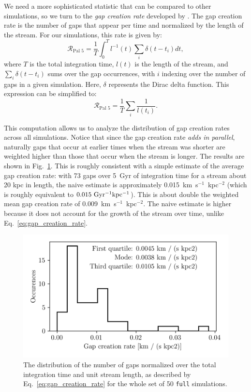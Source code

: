 \documentclass[draft]{aa}
\begin{document}
    We need a more sophisticated statistic that can be compared to other simulations, so we turn to the \textit{gap creation rate} developed by \citet{2012ApJ...748...20C}. The gap creation rate is the number of gaps that appear per time and normalized by the length of the stream. For our simulations, this rate is given by: \begin{equation} \label{eq:gap_creation_rate} \mathcal{R}_{\textrm{Pal 5}} =  \frac{1}{T}\int_{0}^T l^{-1}(t) \sum_i \delta(t-t_i) dt,\end{equation}where $T$ is the total integration time, $l(t)$ is the length of the stream, and $\sum_i \delta(t-t_i)$ sums over the gap occurrences, with $i$ indexing over the number of gaps in a given simulation. Here, $\delta$ represents the Dirac delta function. This expression can be simplified to:\begin{equation}\mathcal{R}_{\textrm{Pal 5}} =  \frac{1}{T} \sum_i \frac{1}{l (t_i)}. \end{equation}
    
    This computation allows us to analyze the distribution of gap creation rates across all simulations. Notice that since the gap creation rate \textit{adds in parallel}, naturally gaps that occur at earlier times when the stream was shorter are weighted higher than those that occur when the stream is longer. The results are shown in Fig.~\ref{fig:gapcreationrate}. This is roughly consistent with a simple estimate of the average gap creation rate: with 73 gaps over 5~Gyr of integration time for a stream about 20 kpc in length, the naive estimate is approximately 0.015~km~s$^{-1}$~kpc$^{-2} $ (which is roughly equivalent to $0.015~\rm{Gyr^{-1}kpc^{-1}}$). This is about double the weighted mean gap creation rate of 0.009~km~s$^{-1}$~kpc$^{-2}$. The naive estimate is higher because it does not account for the growth of the stream over time, unlike Eq.~\ref{eq:gap_creation_rate}.

    \begin{figure}
      \centering
      \includegraphics[width=\linewidth]{gap_creation_rate.png}
      \caption{The distribution of the number of gaps normalized over the total integration time and unit stream length, as described by Eq.~\ref{eq:gap_creation_rate} for the whole set of 50 \texttt{full} simulations. }
      \label{fig:gapcreationrate}
    \end{figure}
\end{document}
